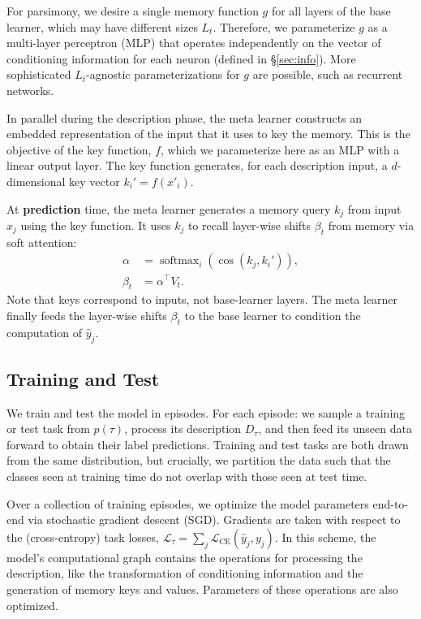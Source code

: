 \documentclass{article}
\DeclareMathOperator*{\softmax}{softmax}
\begin{document}
For parsimony, we desire a single memory function $g$ for all layers of the base learner, which may have different sizes $L_t$.
Therefore, we parameterize $g$ as a multi-layer perceptron (MLP) that operates independently on the vector of conditioning information for each neuron (defined in \S\ref{sec:info}). More sophisticated $L_t$-agnostic parameterizations for $g$ are possible, such as recurrent networks.

In parallel during the description phase, the meta learner constructs an embedded representation of the input that it uses to key the memory. This is the objective of the key function, $f$, which we parameterize here as an MLP with a linear output layer.
The key function generates, for each description input, a $d$-dimensional key vector $k_i' = f(x'_i)$.

At \textbf{prediction} time, the meta learner generates a memory query $k_j$ from input $x_j$ using the key function.
It uses $k_j$ to recall layer-wise shifts $\beta_t$ from memory via soft attention:
\begin{align}
\alpha &= \softmax_i(\cos(k_j, k_i')), \\
\beta_t &= \alpha^{\top}V_t.
\end{align}
Note that keys correspond to inputs, not base-learner layers.
The meta learner finally feeds the layer-wise shifts $\beta_t$ to the base learner to condition the computation of $\hat{y}_j$.

\subsection{Training and Test}
\label{sec:training}
We train and test the model in episodes. For each episode: we sample a training or test task from $p(\tau)$, process its description $D_\tau$, and then feed its unseen data forward to obtain their label predictions.
Training and test tasks are both drawn from the same distribution, but crucially, we partition the data such that the classes seen at training time do not overlap with those seen at test time.

Over a collection of training episodes, we optimize the model parameters end-to-end via stochastic gradient descent (SGD). Gradients are taken with respect to the (cross-entropy) task losses, $\mathcal{L}_\tau = \sum_j \mathcal{L}_\text{CE}(\hat{y}_j, y_j)$.
In this scheme, the model's computational graph contains the operations for processing the description, like the transformation of conditioning information and the generation of memory keys and values. Parameters of these operations are also optimized.
\end{document}
